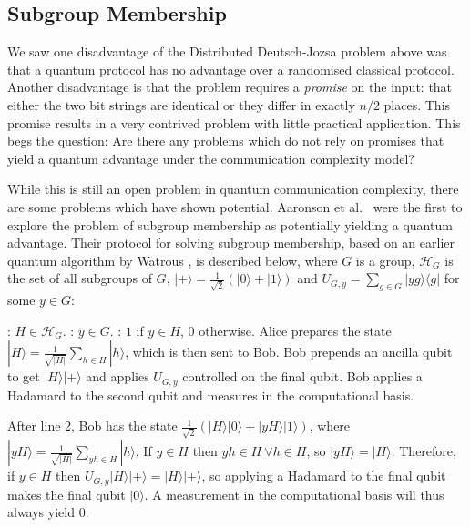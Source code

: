 \documentclass[a4paper]{article}
\begin{document}
        \subsection{Subgroup Membership}

        We saw one disadvantage of the Distributed Deutsch-Jozsa problem above was that a quantum protocol has no advantage over a randomised classical protocol. Another disadvantage is that the problem requires a {\em promise} on the input: that either the two bit strings are identical or they differ in exactly $n/2$ places. This promise results in a very contrived problem with little practical application. This begs the question: Are there any problems which do not rely on promises that yield a quantum advantage under the communication complexity model?

        While this is still an open problem in quantum communication complexity, there are some problems which have shown potential. Aaronson et al.~\cite{0902.3175} were the first to explore the problem of subgroup membership as potentially yielding a quantum advantage. Their protocol for solving subgroup membership, based on an earlier quantum algorithm by Watrous \cite{Watrous:2000:SQP:795666.796590}, is described below, where $G$ is a group, $\mathscr{H}_G$ is the set of all subgroups of $G$, $|+\rangle = \frac{1}{\sqrt{2}}(|0\rangle + |1\rangle)$ and $U_{G, y} = \sum_{g \in G}|yg\rangle\langle g|$ for some $y \in G$:

        \begin{codebox}
            \zi {}: $H \in \mathscr{H}_G$.
            \zi {}: $y \in G$.
            \zi {}: $1$ if $y \in H$, $0$ otherwise.
            \li Alice prepares the state $|H\rangle = \frac{1}{\sqrt{|H|}}\sum_{h \in H}|h\rangle$, which is then sent to Bob.
            \li Bob prepends an ancilla qubit to get $|H\rangle|+\rangle$ and applies $U_{G, y}$ controlled on the final qubit.
            \li Bob applies a Hadamard to the second qubit and measures in the computational basis.
        \end{codebox}

        After line 2, Bob has the state $\frac{1}{\sqrt{2}}(|H\rangle|0\rangle + |yH\rangle|1\rangle)$, where $|yH\rangle = \frac{1}{\sqrt{|H|}}\sum_{yh \in H}|h\rangle$. If $y \in H$ then $yh \in H~ \forall h \in H$, so $|yH\rangle = |H\rangle$. Therefore, if $y \in H$ then $U_{G, y}|H\rangle|+\rangle = |H\rangle|+\rangle$, so applying a Hadamard to the final qubit makes the final qubit $|0\rangle$. A measurement in the computational basis will thus always yield $0$.
\end{document}
